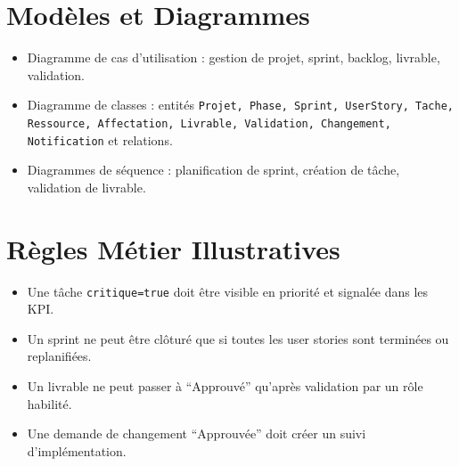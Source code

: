 \section{Modèles et Diagrammes}
\begin{itemize}
  \item Diagramme de cas d'utilisation : gestion de projet, sprint, backlog, livrable, validation.
  \item Diagramme de classes : entités \texttt{Projet, Phase, Sprint, UserStory, Tache, Ressource, Affectation, Livrable, Validation, Changement, Notification} et relations.
  \item Diagrammes de séquence : planification de sprint, création de tâche, validation de livrable.
\end{itemize}

\section{Règles Métier Illustratives}
\begin{itemize}
  \item Une tâche \texttt{critique=true} doit être visible en priorité et signalée dans les KPI.
  \item Un sprint ne peut être clôturé que si toutes les user stories sont terminées ou replanifiées.
  \item Un livrable ne peut passer à “Approuvé” qu'après validation par un rôle habilité.
  \item Une demande de changement “Approuvée” doit créer un suivi d'implémentation.
\end{itemize} 